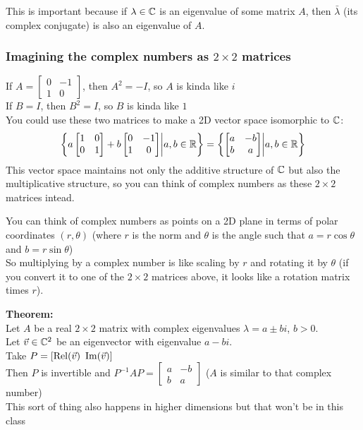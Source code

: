 This is important because if $\lambda \in \mathbb{C}$ is an eigenvalue of some matrix $A$, then $\bar \lambda$ (its complex conjugate) is also an eigenvalue of $A$.

\subsubsection*{Imagining the complex numbers as $2 \times 2$ matrices}

If $A = \begin{bmatrix}0 & -1 \\ 1 & 0\end{bmatrix}$, then $A^2 = -I$, so $A$ is kinda like $i$\\
If $B = I$, then $B^2 = I$, so $B$ is kinda like $1$\\
You could use these two matrices to make a 2D vector space isomorphic to $\mathbb{C}$:
\[\left\{a\begin{bmatrix}1 & 0 \\ 0 & 1\end{bmatrix} + b\begin{bmatrix}0 & -1 \\ 1 & 0\end{bmatrix} \middle\vert a, b \in \mathbb{R}\right\} = \left\{\begin{bmatrix}a & -b \\ b & a\end{bmatrix} \middle\vert a, b \in \mathbb{R}\right\}\]
This vector space maintains not only the additive structure of $\mathbb{C}$ but also the multiplicative structure, so you can think of complex numbers as these $2\times 2$ matrices intead.

You can think of complex numbers as points on a 2D plane in terms of polar coordinates $(r, \theta)$ (where $r$ is the norm and $\theta$ is the angle such that $a = r\cos\theta$ and $b = r\sin\theta$)\\
So multiplying by a complex number is like scaling by $r$ and rotating it by $\theta$ (if you convert it to one of the $2\times2$ matrices above, it looks like a rotation matrix times $r$).

\textbf{Theorem:}\\
Let $A$ be a real $2\times2$ matrix with complex eigenvalues $\lambda = a \pm bi$, $b > 0$.\\
Let $\Vec v \in \mathbb{C}^2$ be an eigenvector with eigenvalue $a - bi$.\\
Take $P = [\operatorname{Rel}(\Vec v) \,\,\operatorname{Im}(\Vec v)]$\\
Then $P$ is invertible and $P^{-1}AP = \begin{bmatrix}a & -b \\ b & a\end{bmatrix}$ ($A$ is similar to that complex number)\\
This sort of thing also happens in higher dimensions but that won't be in this class
